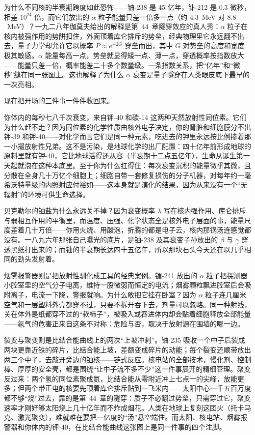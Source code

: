 \begin{challenge}
为什么不同核的半衰期跨度如此恐怖——铀-238 是 \(45\) 亿年，钋-212 是 \(0.3\) 微秒，相差 \(10^{24}\) 倍，而它们放出的 \(\alpha\) 粒子能量只差一倍多一点（约 \(4.3\)~MeV 对 \(8.8\)~MeV）？一九二八年伽莫夫给出的解释是第~44~章隧穿效应的真人秀：\(\alpha\) 粒子在核内被强作用的势阱扣住，外面顶着库仑排斥的势垒，经典物理里它永远翻不出去，量子力学却允许它以概率 \(P\approx e^{-2G}\) 穿垒而出，其中 \(G\) 对势垒的高度和宽度极其敏感。\(\alpha\) 能量每高一点，势垒就显得矮一点、薄一点，穿透概率按指数放大——能量只差一倍，概率能差二十多个数量级。一条指数关系，把“亿年”和“微秒”缝在同一张图上。这也解释了为什么 \(\alpha\) 衰变是量子隧穿在人类眼皮底下最早的一次亮相。
\end{challenge}


现在把开场的三件事一件件收回来。

你体内的每秒七八千次衰变，来自钾-40 和碳-14 这两种天然放射性同位素。它们为什么赶不走？因为同位素的化学性质由核外电子决定，你的肾脏和细胞膜分不出钾-39 和钾-40——对化学而言它们是同一种元素，吃进去的钾里永远按比例掺着那一小撮放射性兄弟。这不是污染，是地球化学的出厂配置：四十亿年前形成地球的原料里就有钾-40，它比地球活得还从容（半衰期十二点五亿年），生命从诞生第一天起就泡在这种本底里。至于你为什么扛得住：每次衰变沉积的能量微乎其微，且分散在全身几十万亿个细胞上；细胞自带一套修复损伤的分子机器，对每年约一毫希沃特量级的内照射应付裕如——这本身就是演化的结果，因为从来没有一个“无辐射”的环境可供生命选择。

贝克勒尔的铀盐为什么永远关不掉？因为衰变概率 \(\lambda\) 写在核内强作用、库仑排斥与弱相互作用的平衡里，而温度、压强、化学状态全是核外电子层面的事，能量尺度差着几十万倍——你用火烧、用酸泡，折腾的都是电子云，核内那锅汤连感觉都没有。一八九六年那张自己曝光的底片，是铀-238 及其衰变子孙放出的 \(\beta\) 与 \(\gamma\) 穿透黑纸打出来的；而铀的半衰期长达四十五亿年，所以那块石头今天还在以几乎相同的劲头发射着。

烟雾报警器则是把放射性驯化成工具的经典案例。镅-241 放出的 \(\alpha\) 粒子把探测器小腔室里的空气分子电离，维持一股微弱而恒定的电流；烟雾颗粒飘进腔室后会吸附离子，电流一下降，警报就响。为什么敢把它挂在卧室？因为 \(\alpha\) 粒子连几厘米空气和一层塑料外壳都穿不过，只要不拆开吞下去，剂量可以忽略。同一种射线，关在体外是纸都穿不过的“软柿子”，被吸入或吞进体内却会贴着细胞释放全部能量——氡气的危害正来自这条不对称：危险与否，取决于放射源在围墙的哪一边。

裂变与聚变则是比结合能曲线上的两次“上坡冲刺”。铀-235 吸收一个中子后裂成两块更靠近铁的碎片，比结合能上坡，差额变成碎片的动能；每个裂变还顺带放出两三个中子，去敲开旁边的铀核——链式反应。核电站的全部技术，慢化剂、控制棒、厚厚的安全壳，都是围绕“让中子流不多不少”这一件事展开的精细管理。聚变反过来：两个氢的同位素聚成氦，比结合能从零附近冲上七点一的尖峰，放能更多；但两个带正电的核要先顶着库仑排斥贴到一飞米内——太阳中心一千五百万度都不够“烧”过去，靠的是第~44~章的隧穿：质子不必翻过势垒，只需穿过它，聚变速率才刚好够太阳烧上几十亿年而不炸成烟花。人类在地球上复刻这团火（托卡马克、激光聚变），难就难在要把一亿度的“汤”悬空端住。而太阳、核电站、烟雾报警器和你体内的钾-40，在比结合能曲线这张图上是同一件事的四个注脚。


